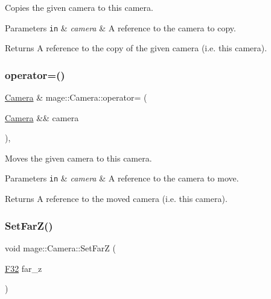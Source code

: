 Copies the given camera to this camera.


\begin{DoxyParams}[1]{Parameters}
\mbox{\tt in}  & {\em camera} & A reference to the camera to copy. \\
\hline
\end{DoxyParams}
\begin{DoxyReturn}{Returns}
A reference to the copy of the given camera (i.\+e. this camera). 
\end{DoxyReturn}
\hypertarget{classmage_1_1_camera_ac52101822e004915a96150305564a6bf}{}\label{classmage_1_1_camera_ac52101822e004915a96150305564a6bf} 
\subsubsection{\texorpdfstring{operator=()}{operator=()}\hspace{0.1cm}{\footnotesize\ttfamily [2/2]}}
{\footnotesize\ttfamily \hyperlink{classmage_1_1_camera}{Camera} \& mage\+::\+Camera\+::operator= (\begin{DoxyParamCaption}\item[{\hyperlink{classmage_1_1_camera}{Camera} \&\&}]{camera }\end{DoxyParamCaption})\hspace{0.3cm}{\ttfamily [default]}, {\ttfamily [noexcept]}}

Moves the given camera to this camera.


\begin{DoxyParams}[1]{Parameters}
\mbox{\tt in}  & {\em camera} & A reference to the camera to move. \\
\hline
\end{DoxyParams}
\begin{DoxyReturn}{Returns}
A reference to the moved camera (i.\+e. this camera). 
\end{DoxyReturn}
\hypertarget{classmage_1_1_camera_aa49995ef824eeb807656921406d248a5}{}\label{classmage_1_1_camera_aa49995ef824eeb807656921406d248a5} 
\subsubsection{\texorpdfstring{Set\+Far\+Z()}{SetFarZ()}}
{\footnotesize\ttfamily void mage\+::\+Camera\+::\+Set\+FarZ (\begin{DoxyParamCaption}\item[{\hyperlink{namespacemage_aa97e833b45f06d60a0a9c4fc22ae02c0}{F32}}]{far\+\_\+z }\end{DoxyParamCaption})\hspace{0.3cm}{\ttfamily [noexcept]}}

